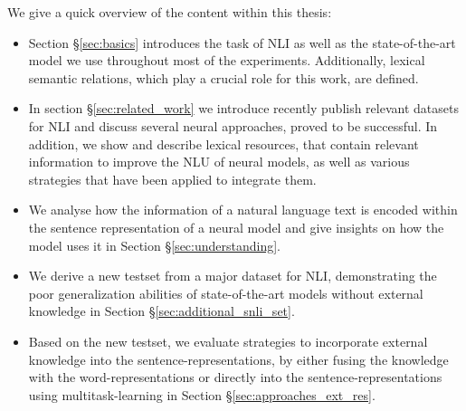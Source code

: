 \noindent
We give a quick overview of the content within this thesis:
\begin{itemize}
\item Section §\ref{sec:basics} introduces the task of \ac{NLI} as well as the state-of-the-art model we use throughout most of the experiments. Additionally, lexical semantic relations, which play a crucial role for this work, are defined.
\item In section §\ref{sec:related_work} we introduce recently publish relevant datasets for \ac{NLI} and discuss several neural approaches, proved to be successful. In addition, we show and describe lexical resources, that contain relevant information to improve the \ac{NLU} of neural models, as well as various strategies that have been applied to integrate them.
\item We analyse how the information of a natural language text is encoded within the sentence representation of a neural model and give insights on how the model uses it in Section §\ref{sec:understanding}.
\item We derive a new testset from a major dataset for \ac{NLI}, demonstrating the poor generalization abilities of state-of-the-art models without external knowledge in Section §\ref{sec:additional_snli_set}.
\item Based on the new testset, we evaluate strategies to incorporate external knowledge into the sentence-representations, by either fusing the knowledge with the word-representations or directly into the sentence-representations using multitask-learning in Section §\ref{sec:approaches_ext_res}.
\end{itemize}